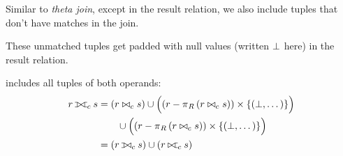 \begin{multicols}{2}

    \begin{CheatsheetEntryFrame}

        \newcommand{\RelAlgVennDiagram}[3]{%
            \begin{tikzpicture}[scale=0.4, transform shape]
                \begin{scope} %
                    \clip
                        (-1, -1) rectangle (2.2, 1)
                        (1.2, 0) circle (1)
                    ;
                    \fill[#1] (0, 0) circle (1);
                \end{scope}
                \begin{scope} %
                    \clip (1.2, 0) circle (1);
                    \fill[#2] (0, 0) circle (1);
                \end{scope}
                \begin{scope} %
                    \clip
                        (-1, -1) rectangle (2.2, 1)
                        (0, 0) circle (1)
                    ;
                    \fill[#3] (1.2, 0) circle (1);
                \end{scope}
                \begin{scope} %
                    \draw[line width=2.0pt]
                        (1.2, 0) circle (1)
                        (0, 0) circle (1)
                    ;
                \end{scope}
            \end{tikzpicture}%
        }


        Similar to \textit{theta join}, except in the result relation, we also include tuples that don't have matches in the join.

        These unmatched tuples get padded with null values (written $\mathord{\bot}$ here) in the result relation.


        \vspace{\TextExtraSkip}%
        \textit{} includes all tuples of both operands:
        \begin{align*}
            r \relfullouterjoin_c s &=
                (r \bowtie_c s)
                \cup \parens*{\vphantom{\frac{x}{x}}
                    \parens*{r - \relproject_R{(r \bowtie_c s)}}
                    \times \braces*{(\relnullvalue, \dots)}
                } \\
            &
                \qquad
                \cup \parens*{\vphantom{\frac{x}{x}}
                    \parens*{r - \relproject_R{(r \bowtie_c s)}}
                    \times \braces*{(\relnullvalue, \dots)}
                } \\
            &= (r \relleftouterjoin_c s) \cup (r \relrightouterjoin_c s)
        \end{align*}


\end{CheatsheetEntryFrame}
\end{multicols}

